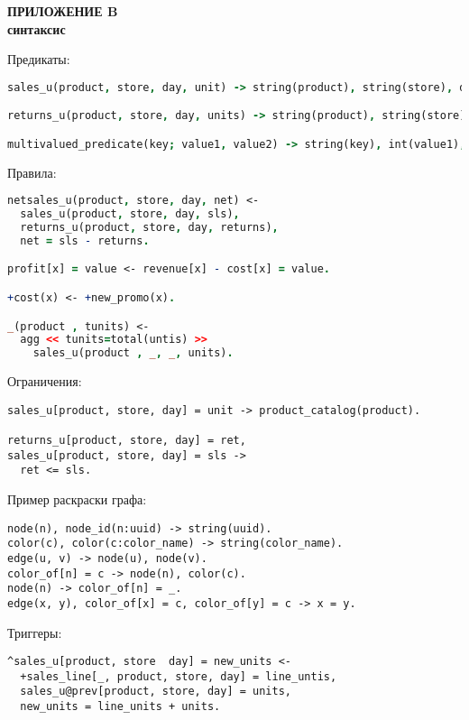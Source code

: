 \newpage
\begin{center}
\textbf{
\MakeUppercase{Приложение B}\\
\logiql синтаксис}
\end{center}

Предикаты:

\begin{lstlisting}[language=Prolog]
sales_u(product, store, day, unit) -> string(product), string(store), datetime(day), int(unit).

returns_u(product, store, day, units) -> string(product), string(store), datetime(day), int(units).

multivalued_predicate(key; value1, value2) -> string(key), int(value1), int(value2).
\end{lstlisting}

Правила:

\begin{lstlisting}[language=Prolog]
netsales_u(product, store, day, net) <-
  sales_u(product, store, day, sls),
  returns_u(product, store, day, returns),
  net = sls - returns.

profit[x] = value <- revenue[x] - cost[x] = value.

+cost(x) <- +new_promo(x).

_(product , tunits) <-
  agg << tunits=total(untis) >>
    sales_u(product , _, _, units).


\end{lstlisting}

Ограничения:

\begin{lstlisting}
sales_u[product, store, day] = unit -> product_catalog(product).

returns_u[product, store, day] = ret,
sales_u[product, store, day] = sls ->
  ret <= sls.
\end{lstlisting}

Пример раскраски графа:

\begin{lstlisting}
node(n), node_id(n:uuid) -> string(uuid).
color(c), color(c:color_name) -> string(color_name).
edge(u, v) -> node(u), node(v).
color_of[n] = c -> node(n), color(c).
node(n) -> color_of[n] = _.
edge(x, y), color_of[x] = c, color_of[y] = c -> x = y.
\end{lstlisting}

Триггеры:

\begin{lstlisting}
^sales_u[product, store  day] = new_units <-
  +sales_line[_, product, store, day] = line_untis,
  sales_u@prev[product, store, day] = units,
  new_units = line_units + units.
\end{lstlisting}
